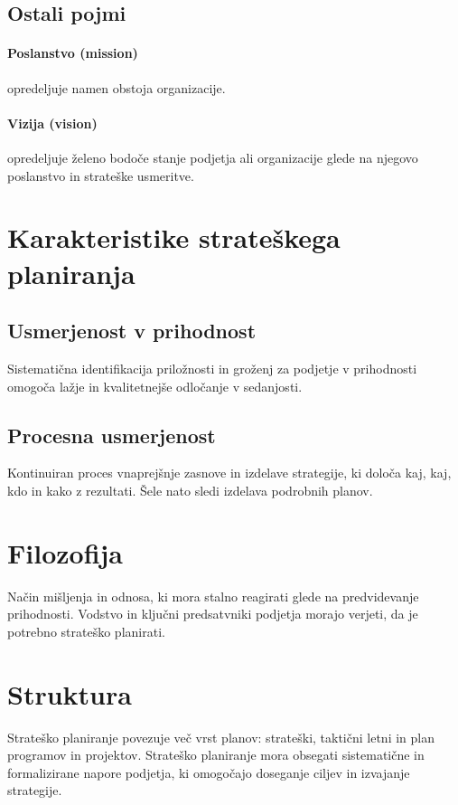 \documentclass[a4paper,12pt]{report}
\begin{document}
      \subsection{Ostali pojmi}
         \paragraph{Poslanstvo (mission)} opredeljuje namen obstoja organizacije.
         \paragraph{Vizija (vision)} opredeljuje želeno bodoče stanje podjetja ali organizacije glede na njegovo poslanstvo in strateške usmeritve.
   
   \section{Karakteristike strateškega planiranja}
      \subsection{Usmerjenost v prihodnost}
         Sistematična identifikacija priložnosti in groženj za podjetje v prihodnosti omogoča lažje in kvalitetnejše odločanje v sedanjosti.

      \subsection{Procesna usmerjenost}
         Kontinuiran proces vnaprejšnje zasnove in izdelave strategije, ki določa kaj, kaj, kdo in kako z rezultati. Šele nato sledi izdelava podrobnih planov.

      \section{Filozofija}
         Način mišljenja in odnosa, ki mora stalno reagirati glede na predvidevanje prihodnosti. Vodstvo in ključni predsatvniki podjetja morajo verjeti, da je potrebno strateško planirati.

      \section{Struktura}
         Strateško planiranje povezuje več vrst planov: strateški, taktični letni in plan programov in projektov. Strateško planiranje mora obsegati sistematične in formalizirane napore podjetja, ki omogočajo doseganje ciljev in izvajanje strategije.
\end{document}
